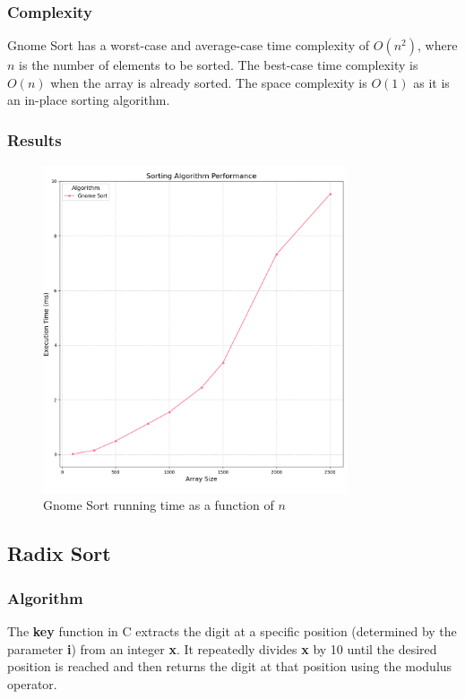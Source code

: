 \documentclass{article}
\begin{document}
\subsubsection{Complexity}
Gnome Sort has a worst-case and average-case time complexity of $O(n^2)$, where $n$ is the number of elements to be sorted. The best-case time complexity is $O(n)$ when the array is already sorted. The space complexity is $O(1)$ as it is an in-place sorting algorithm.

\subsubsection{Results}
\begin{figure}[H]
	\includegraphics[width=0.8\textwidth]{images/gnome_sort.png}
	\caption{Gnome Sort running time as a function of $n$}
\end{figure}


\subsection{Radix Sort}

\subsubsection{Algorithm}
The \textbf{key} function in C extracts the digit at a specific position (determined by the parameter \textbf{i}) from an integer \textbf{x}. It repeatedly divides \textbf{x} by 10 until the desired position is reached and then returns the digit at that position using the modulus operator.
\end{document}
